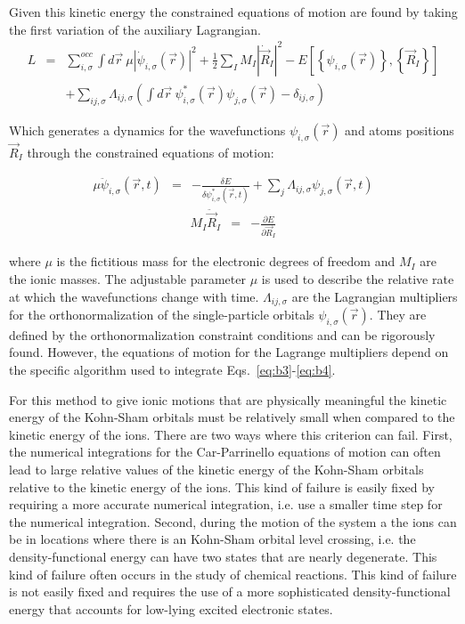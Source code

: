 \noindent
Given this kinetic energy the constrained equations of motion are found 
by taking the first variation of the auxiliary Lagrangian.
\begin{eqnarray}
\label{appendix:b2}
L &=& \sum_{i,\sigma}^{occ} \int d\vec{r}\ \mu \left| 
     \dot{\psi}_{i,\sigma}(\vec{r}) \right|^2 
     + \frac 12 \sum_I M_I \left| \dot{\vec{R}}_I \right|^2 
- E\left[ \left\{ \psi_{i,\sigma}(\vec{r})\right\},\left\{\vec{R}_I \right\} \right]  
\nonumber \\
&&+\sum_{ij,\sigma} \Lambda_{ij,\sigma} \left( \int d\vec{r}\ 
\psi_{i,\sigma}^{*}(\vec{r}) \psi_{j,\sigma}(\vec{r}) - \delta_{ij,\sigma} 
\right) 
\end{eqnarray}

\noindent
Which generates a dynamics for the wavefunctions $\psi_{i,\sigma}(\vec{r})$ and 
atoms positions $\vec{R}_I$ through the constrained equations of motion:

\begin{eqnarray}
\mu \ddot{\psi}_{i,\sigma}(\vec{r},t) &=& -\frac{\delta E}{\delta \psi_{i,\sigma }^{*}
\left( \vec{r},t \right) } + \sum\limits_j \Lambda_{ij,\sigma} 
\psi_{j,\sigma} \left( \vec{r},t \right)
\label{eq:b3}
\end{eqnarray}
\begin{eqnarray}
M_I \ddot{\vec{R}}_I &=& -\frac{\partial E}{\partial \vec{R}_I}
\label{eq:b4}
\end{eqnarray}

\noindent
where $\mu$ is the fictitious mass for the electronic degrees of freedom and 
$M_I$ are the ionic masses.  
The adjustable parameter $\mu$ is used to 
describe the relative rate at which the wavefunctions change with time.  
$\Lambda_{ij,\sigma}$ are the 
Lagrangian multipliers for the orthonormalization of the single-particle 
orbitals $\psi_{i,\sigma}(\vec{r})$. 
They are defined by the orthonormalization constraint conditions
and can be rigorously found. 
However, the equations of motion for the Lagrange multipliers
depend on the specific algorithm used to integrate
Eqs.~\ref{eq:b3}-\ref{eq:b4}.

For this method to give ionic motions that are physically meaningful
the kinetic energy of the Kohn-Sham orbitals must be relatively
small when compared to the kinetic energy of the ions.
There are two ways where this criterion can fail.
First, the numerical integrations for the Car-Parrinello equations of motion 
can often lead to large relative values of the kinetic energy of 
the Kohn-Sham orbitals relative to the kinetic energy of the ions.
This kind of failure is easily fixed by requiring a more accurate
numerical integration, i.e. use a smaller time step for the numerical
integration.
Second, during the motion of the system a the ions can be in locations where
there is an Kohn-Sham orbital level crossing, i.e. the density-functional
energy can have two states that are nearly degenerate.  This kind
of failure often occurs in the study of chemical reactions.
This kind of failure is not easily fixed and requires the use
of a more sophisticated density-functional energy that accounts
for low-lying excited electronic states.


